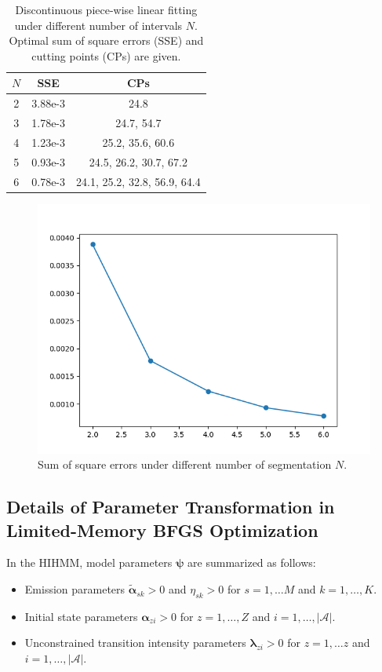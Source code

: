 \documentclass{article}
\begin{document}
\begin{table}[ht!]
	\centering
	\caption{Discontinuous piece-wise linear fitting under different number of intervals $N$. Optimal sum of square errors (SSE) and cutting points (CPs) are given.}
	\label{age_segmentation}
	\begin{tabular}{|c|c|c|}
		\hline
		$N$ & SSE & CPs\\
		\hline
		2 & 3.88e-3 & 24.8 \\
		\hline
		3 & 1.78e-3 & 24.7, 54.7 \\
		\hline
		4 & 1.23e-3 & 25.2, 35.6, 60.6  \\
		\hline
		5 & 0.93e-3 & 24.5, 26.2, 30.7, 67.2 \\
		\hline
		6 & 0.78e-3 & 24.1, 25.2, 32.8, 56.9, 64.4 \\
		\hline
	\end{tabular}
\end{table}

\begin{figure}[ht!]
	\centering
	\includegraphics[scale=0.5]{pic/hmm/sse_vs_n}
	\caption{Sum of square errors under different number of segmentation $N$.}
	\label{age_segmentation_plot}
\end{figure}


\subsection{Details of Parameter Transformation in Limited-Memory BFGS Optimization}
In the HIHMM, model parameters $\bm \psi$ are summarized as follows:
\begin{itemize}
	\item Emission parameters $\tilde{\bm \alpha}_{sk} > 0$ and $\eta_{sk} > 0$ for $s = 1, \ldots M$ and $k = 1,\ldots, K$.
	\item Initial state parameters $\bm \alpha_{zi} > 0$ for $z = 1,\ldots, Z$ and $i = 1, \ldots, |\mathcal{A}|$.
	\item Unconstrained transition intensity parameters $\bm \lambda_{zi} > 0$ for $z = 1,\ldots z$ and $i = 1, \ldots, |\mathcal{A}|$.
\end{itemize}
\end{document}
